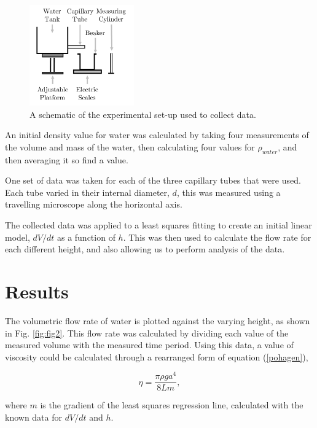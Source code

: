 \documentclass[twocolumn]{revtex4}
\begin{document}
\begin{figure}[!h]
\begin{center}
\includegraphics[width=4.5cm]{fig1}
\caption[]{A schematic of the experimental set-up used to collect data. }
\label{fig:fig1}
\end{center}
\end{figure}

An initial density value for water was calculated by taking four measurements of the volume and mass of the water, then calculating four values for $\rho_{water}$, and then averaging it so find a value. 

One set of data was taken for each of the three capillary tubes that were used. Each tube varied in their internal diameter, $d$, this was measured using a travelling microscope along the horizontal axis. 

The collected data was applied to a least squares fitting to create an initial linear model, $dV/dt$ as a function of $h$. This was then used to calculate the flow rate for each different height, and also allowing us to perform analysis of the data.

\vspace{-3ex}
\section{Results}
\vspace{-2ex}

The volumetric flow rate of water is plotted against the varying height, as shown in Fig. \ref{fig:fig2}. This flow rate was calculated by dividing each value of the measured volume with the measured time period. Using this data, a value of viscosity could be calculated through a rearranged form of equation (\ref{pohagen}),

\begin{equation} 
\eta=\frac{\pi \rho g a^4 }{8 L m}, 
\label{r-pohagen}
\end{equation}

where $m$ is the gradient of the least squares regression line, calculated with the known data for $dV/dt$ and $h$.
\end{document}
